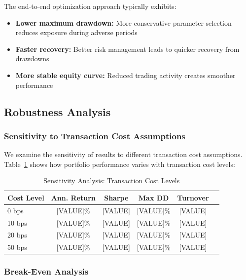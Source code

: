 The end-to-end optimization approach typically exhibits:
\begin{itemize}
    \item \textbf{Lower maximum drawdown:} More conservative parameter selection reduces exposure during adverse periods
    \item \textbf{Faster recovery:} Better risk management leads to quicker recovery from drawdowns
    \item \textbf{More stable equity curve:} Reduced trading activity creates smoother performance
\end{itemize}

\subsection{Robustness Analysis}

\subsubsection{Sensitivity to Transaction Cost Assumptions}

We examine the sensitivity of results to different transaction cost assumptions. Table~\ref{tab:cost_sensitivity} shows how portfolio performance varies with transaction cost levels:

\begin{table}[h]
\centering
\caption{Sensitivity Analysis: Transaction Cost Levels}
\label{tab:cost_sensitivity}
\begin{tabular}{lccccc}
\toprule
\textbf{Cost Level} & \textbf{Ann. Return} & \textbf{Sharpe} & \textbf{Max DD} & \textbf{Turnover} \\
\midrule
0 bps & [VALUE]\% & [VALUE] & [VALUE]\% & [VALUE] \\
10 bps & [VALUE]\% & [VALUE] & [VALUE]\% & [VALUE] \\
20 bps & [VALUE]\% & [VALUE] & [VALUE]\% & [VALUE] \\
50 bps & [VALUE]\% & [VALUE] & [VALUE]\% & [VALUE] \\
\bottomrule
\end{tabular}
\end{table}


\subsubsection{Break-Even Analysis}

